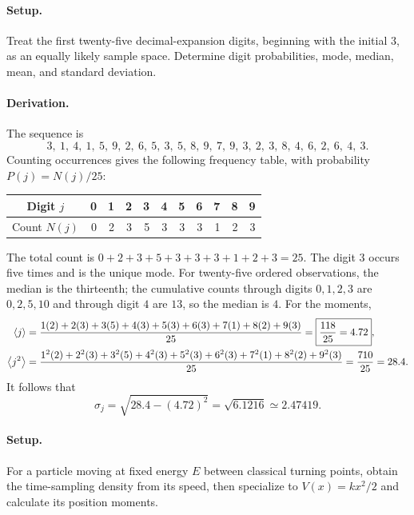 \paragraph{Setup.} Treat the first twenty-five decimal-expansion digits, beginning with the initial $3$, as an equally likely sample space. Determine digit probabilities, mode, median, mean, and standard deviation.
\paragraph{Derivation.}
The sequence is
\begin{equation}
3,\ 1,\ 4,\ 1,\ 5,\ 9,\ 2,\ 6,\ 5,\ 3,\ 5,\ 8,\ 9,\
7,\ 9,\ 3,\ 2,\ 3,\ 8,\ 4,\ 6,\ 2,\ 6,\ 4,\ 3.
\end{equation}
Counting occurrences gives the following frequency table, with probability $P(j)=N(j)/25$:
\begin{center}
\begin{tabular}{c*{10}{r}}
\toprule
Digit $j$&0&1&2&3&4&5&6&7&8&9\\
\midrule
Count $N(j)$&0&2&3&5&3&3&3&1&2&3\\
\bottomrule
\end{tabular}
\end{center}
The total count is $0+2+3+5+3+3+3+1+2+3=25$. The digit $3$ occurs five times and is the unique mode. For twenty-five ordered observations, the median is the thirteenth; the cumulative counts through digits $0,1,2,3$ are $0,2,5,10$ and through digit $4$ are $13$, so the median is $4$. For the moments,
\begin{align}
\left\langle j\right\rangle&=\frac{1(2)+2(3)+3(5)+4(3)+5(3)+6(3)+7(1)+8(2)+9(3)}{25}
=\boxed{\frac{118}{25}=4.72},\\
\left\langle j^2\right\rangle&=\frac{1^2(2)+2^2(3)+3^2(5)+4^2(3)+5^2(3)+6^2(3)+7^2(1)+8^2(2)+9^2(3)}{25}
=\frac{710}{25}=28.4.
\end{align}
It follows that
\begin{equation}
\boxed{\sigma_j=\sqrt{28.4-(4.72)^2}=\sqrt{6.1216}\simeq2.47419.}
\end{equation}

\paragraph{Setup.} For a particle moving at fixed energy $E$ between classical turning points, obtain the time-sampling density from its speed, then specialize to $V(x)=kx^2/2$ and calculate its position moments.

